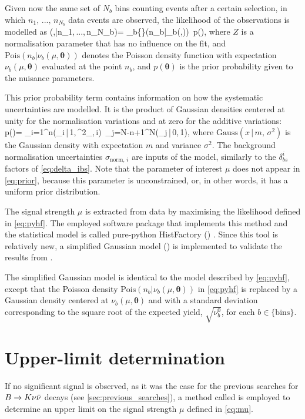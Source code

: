 Given now the same set of $N_b$ bins counting events after a certain selection, in which $n_1,\,...,\,n_{N_b}$ data events are observed, the likelihood of the observations is modelled as
\be \label{eq:pyhf}
(\mu,\boldsymbol{\theta}|n_1,\,...,\,n_{N_b})=
\prod_{b\in\{\}}(n_b|\nu_b(\mu,\boldsymbol{\theta}))\,
p(\boldsymbol{\theta}),
\ee
where $Z$ is a normalisation parameter that has no influence on the fit, and $\mathrm{Pois}(n_b|\nu_b(\mu,\boldsymbol{\theta}))$ denotes the Poisson density function with expectation $\nu_b(\mu,\boldsymbol{\theta})$ evaluated at the point $n_b$, and $p(\boldsymbol{\theta})$ is the prior probability given to the nuisance parameters.

This prior probability term contains information on how the systematic uncertainties are modelled.
It is the product of Gaussian densities centered at unity for the normalisation variations and at zero for the additive variations:
\be \label{eq:prior}
p(\boldsymbol{\theta})=
\prod_{i=1}^{n}(\theta_i\,|\,1,\,\sigma^2_{,\,i})\,
\prod_{j=N-n+1}^{N}(\theta_j\,|\,0,\,1),
\ee
where $\mathrm{Gauss}(x\,|\,m,\,\sigma^2)$ is the Gaussian density with expectation $m$ and variance $\sigma^2$.
The background normalisation uncertainties $\sigma_{\mathrm{norm},\,i}$ are inputs of the model, similarly to the $\delta^i_{bs}$ factors of \cref{eq:delta_ibs}.
Note that the parameter of interest $\mu$ does not appear in \cref{eq:prior}, because this parameter is unconstrained, or, in other words, it has a uniform prior distribution.

The signal strength $\mu$ is extracted from data by maximising the likelihood defined in \cref{eq:pyhf}.
The employed software package that implements this method and the statistical model is called pure-python HistFactory (\pyhf) \cite{Heinrich2021}. Since this tool is relatively new, a simplified Gaussian model (\sghf) is implemented to validate the results from \pyhf.

The simplified Gaussian model is identical to the model described by \cref{eq:pyhf}, except that the Poisson density $\mathrm{Pois}(n_b|\nu_b(\mu,\boldsymbol{\theta}))$ in \cref{eq:pyhf} is replaced by a Gaussian density centered at $\nu_b(\mu,\boldsymbol{\theta})$ and with a standard deviation corresponding to the square root of the expected yield, $\sqrt{\nu^0_{b}}$, for each $b\in\{\mathrm{bins}\}$.
\section{Upper-limit determination} \label{sec:da_upper_limit}
If no significant signal is observed, as it was the case for the previous searches for $B\rightarrow K\nu\bar{\nu}$ decays (see \cref{sec:previous_searches}), a method called \CLs \cite{Read2002} is employed to determine an upper limit on the signal strength $\mu$ defined in \cref{eq:mu}.

